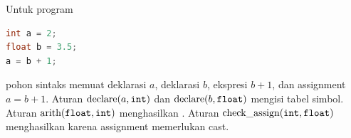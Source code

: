 \begin{contoh}
Untuk program
\begin{lstlisting}[language=C]
int a = 2;
float b = 3.5;
a = b + 1;
\end{lstlisting}
pohon sintaks memuat deklarasi \(a\), deklarasi \(b\), ekspresi
\(b + 1\), dan assignment \(a = b + 1\). Aturan
\(\text{declare}(a,\texttt{int})\) dan
\(\text{declare}(b,\texttt{float})\) mengisi tabel simbol. Aturan
\(\text{arith}(\texttt{float},\texttt{int})\) menghasilkan
. Aturan
\(\text{check\_assign}(\texttt{int},\texttt{float})\) menghasilkan
 karena assignment memerlukan cast.
\end{contoh}
